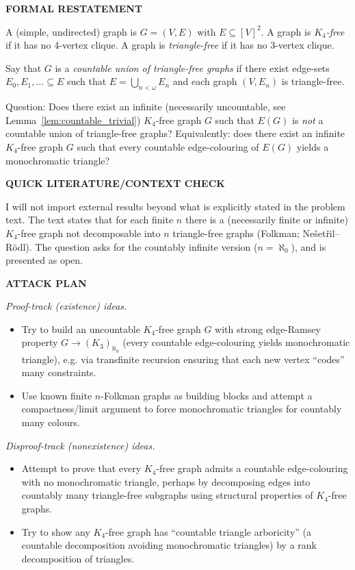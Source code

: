 \bigskip
\noindent\textbf{FORMAL RESTATEMENT}

A (simple, undirected) graph is $G=(V,E)$ with $E\subseteq [V]^2$.
A graph is \emph{$K_4$-free} if it has no 4-vertex clique.
A graph is \emph{triangle-free} if it has no 3-vertex clique.

Say that $G$ is a \emph{countable union of triangle-free graphs} if there exist edge-sets $E_0,E_1,\dots\subseteq E$ such that $E=\bigcup_{n<\omega} E_n$ and each graph $(V,E_n)$ is triangle-free.

Question: Does there exist an infinite (necessarily uncountable, see Lemma~\ref{lem:countable_trivial}) $K_4$-free graph $G$ such that $E(G)$ is \emph{not} a countable union of triangle-free graphs?
Equivalently: does there exist an infinite $K_4$-free graph $G$ such that every countable edge-colouring of $E(G)$ yields a monochromatic triangle?

\bigskip
\noindent\textbf{QUICK LITERATURE/CONTEXT CHECK}

I will not import external results beyond what is explicitly stated in the problem text.
The text states that for each finite $n$ there is a (necessarily finite or infinite) $K_4$-free graph not decomposable into $n$ triangle-free graphs (Folkman; Ne\v{s}et\v{r}il--R\"{o}dl).
The question asks for the countably infinite version ($n=\aleph_0$), and is presented as open.

\bigskip
\noindent\textbf{ATTACK PLAN}

\emph{Proof-track (existence) ideas.}
\begin{itemize}
\item Try to build an uncountable $K_4$-free graph $G$ with strong edge-Ramsey property $G\to(K_3)_{\aleph_0}$ (every countable edge-colouring yields monochromatic triangle), e.g. via transfinite recursion ensuring that each new vertex ``codes'' many constraints.
\item Use known finite $n$-Folkman graphs as building blocks and attempt a compactness/limit argument to force monochromatic triangles for countably many colours.
\end{itemize}

\emph{Disproof-track (nonexistence) ideas.}
\begin{itemize}
\item Attempt to prove that every $K_4$-free graph admits a countable edge-colouring with no monochromatic triangle, perhaps by decomposing edges into countably many triangle-free subgraphs using structural properties of $K_4$-free graphs.
\item Try to show any $K_4$-free graph has ``countable triangle arboricity'' (a countable decomposition avoiding monochromatic triangles) by a rank decomposition of triangles.
\end{itemize}

